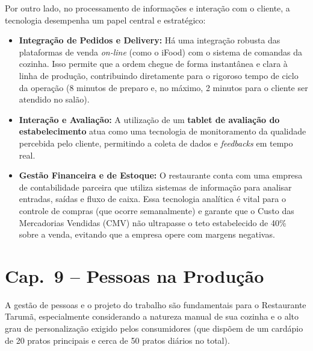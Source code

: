 \documentclass[12pt, a4paper]{article}
\begin{document}
Por outro lado, no processamento de informações e interação com o cliente, a tecnologia desempenha um papel central e estratégico:
\begin{itemize}
    \item \textbf{Integração de Pedidos e Delivery:} Há uma integração robusta das plataformas de venda \textit{on-line} (como o iFood) com o sistema de comandas da cozinha. Isso permite que a ordem chegue de forma instantânea e clara à linha de produção, contribuindo diretamente para o rigoroso tempo de ciclo da operação (8 minutos de preparo e, no máximo, 2 minutos para o cliente ser atendido no salão).
    \item \textbf{Interação e Avaliação:} A utilização de um \textbf{tablet de avaliação do estabelecimento} atua como uma tecnologia de monitoramento da qualidade percebida pelo cliente, permitindo a coleta de dados e \textit{feedbacks} em tempo real.
    \item \textbf{Gestão Financeira e de Estoque:} O restaurante conta com uma empresa de contabilidade parceira que utiliza sistemas de informação para analisar entradas, saídas e fluxo de caixa. Essa tecnologia analítica é vital para o controle de compras (que ocorre semanalmente) e garante que o Custo das Mercadorias Vendidas (CMV) não ultrapasse o teto estabelecido de 40\% sobre a venda, evitando que a empresa opere com margens negativas.
\end{itemize}

\section{Cap.~9 – Pessoas na Produção}

A gestão de pessoas e o projeto do trabalho são fundamentais para o Restaurante Tarumã, especialmente considerando a natureza manual de sua cozinha e o alto grau de personalização exigido pelos consumidores (que dispõem de um cardápio de 20 pratos principais e cerca de 50 pratos diários no total).
\end{document}

